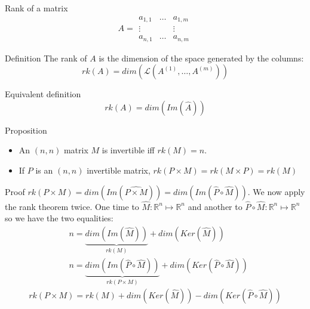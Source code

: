 \documentclass{beamer}
\begin{document}
\begin{frame}{Rank of a matrix}
  \[A = \begin{array}{|ccc|} a_{1,1} & \dots & a_{1,m}\\ \vdots & & \vdots\\ a_{n,1} & \dots & a_{n, m} \end{array}\]
  
  \begin{block}{Definition}
    The rank of $A$ is the dimension of the space generated by the columns:
    \[rk(A) = dim(\mathcal{L}(A^{(1)}, \dots, A^{(m)}))\]
  \end{block}
  
\end{frame}

\begin{frame}
  \begin{block}{Equivalent definition}
    \[ rk(A) = dim(Im(\widehat{A}))\]
  \end{block}
\end{frame}

\begin{frame}
  \begin{block}{Proposition}
    \begin{itemize}
    \item An $(n,n)$ matrix $M$ is invertible iff $rk(M) = n$.
    \item If $P$ is an $(n,n)$ invertible matrix, $rk(P \times M) = rk(M \times P) = rk(M)$
    \end{itemize}
  \end{block}
\end{frame}

\begin{frame}{Proof}
    $rk(P \times M) = dim(Im(\widehat{P \times M})) = dim(Im(\widehat{P} \circ \widehat{M}))$. We now apply the rank theorem twice. One time to $\widehat{M}: \mathbb{R}^n \mapsto \mathbb{R}^n$ and another to $\widehat{P} \circ \widehat{M}: \mathbb{R}^n \mapsto \mathbb{R}^n$ so we have the two equalities:
    \[\begin{aligned}
    &n = \underbrace{dim(Im(\widehat{M}))}_{rk(M)} + dim(Ker(\widehat{M}))\\
    &n = \underbrace{dim(Im(\widehat{P} \circ \widehat{M}))}_{rk(P \times M)} + dim(Ker(\widehat{P} \circ \widehat{M}))
    \end{aligned}
    \]
    \[ rk(P \times M) = rk(M) + dim(Ker(\widehat{M})) - dim(Ker(\widehat{P} \circ \widehat{M})) \]
  \end{frame}
\end{document}
